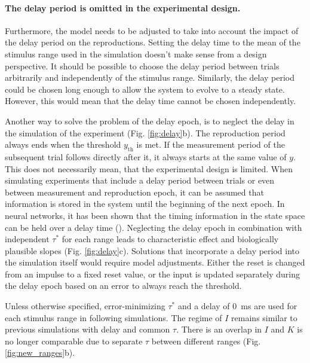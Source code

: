 \documentclass[10pt]{article}
\begin{document}
\paragraph{The delay period is omitted in the experimental design.}
Furthermore, the model needs to be adjusted to take into account the impact of the delay period on the reproductions. 
Setting the delay time to the mean of the stimulus range used in the simulation doesn't make sense from a design perspective. It should be possible to choose the delay period between trials arbitrarily and independently of the stimulus range. 
Similarly, the delay period could be chosen long enough to allow the system to evolve to a steady state. However, this would mean that the delay time cannot be chosen independently.

Another way to solve the problem of the delay epoch, is to neglect the delay in the simulation of the experiment (Fig. \ref{fig:delay}b).
The reproduction period always ends when the threshold $y_\text{th}$ is met. If the measurement period of the subsequent trial follows directly after it, it always starts at the same value of $y$. 
This does not necessarily mean, that the experimental design is limited. When simulating experiments that include a delay period between trials or even between measurement and reproduction epoch, it can be assumed that information is stored in the system until the beginning of the next epoch. 
In neural networks, it has been shown that the timing information in the state space can be held over a delay time (\cite{Bi2020}).
Neglecting the delay epoch in combination with independent $\tau^*$ for each range leads to characteristic effect and biologically plausible slopes (Fig. \ref{fig:delay}c).
Solutions that incorporate a delay period into the simulation itself would require model adjustments.
Either the reset is changed from an impulse to a fixed reset value, or the input is updated separately during the delay epoch based on an error to always reach the threshold. 

Unless otherwise specified, error-minimizing $\tau^*$ and a delay of 0~ms are used for each stimulus range in following simulations. The regime of $I$ remains similar to previous simulations with delay and common $\tau$. There is an overlap in $I$ and $K$ is no longer comparable due to separate $\tau$ between different ranges (Fig. \ref{fig:new_ranges}b).
\end{document}
